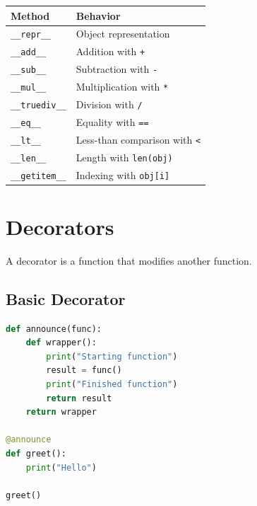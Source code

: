 \documentclass[12pt,oneside]{book}
\numberwithin{equation}{section}
\theoremstyle{definition}
\theoremstyle{plain}
\theoremstyle{remark}
\begin{document}
\begin{center}
\begin{xltabular}{\textwidth}{>{\raggedright\arraybackslash}p{0.25\textwidth}
>{\raggedright\arraybackslash}X}
\toprule
Method & Behavior \\
\midrule
\texttt{\_\_repr\_\_} & Object representation \\

\texttt{\_\_add\_\_} & Addition with \texttt{+} \\

\texttt{\_\_sub\_\_} & Subtraction with \texttt{-} \\

\texttt{\_\_mul\_\_} & Multiplication with \texttt{*} \\

\texttt{\_\_truediv\_\_} & Division with \texttt{/} \\

\texttt{\_\_eq\_\_} & Equality with \texttt{==} \\

\texttt{\_\_lt\_\_} & Less-than comparison with \texttt{<} \\

\texttt{\_\_len\_\_} & Length with \texttt{len(obj)} \\

\texttt{\_\_getitem\_\_} & Indexing with \texttt{obj[i]} \\
\bottomrule
\end{xltabular}
\end{center}

\section{Decorators}

A decorator is a function that modifies another function.

\subsection{Basic Decorator}

\begin{lstlisting}[language=Python]
def announce(func):
    def wrapper():
        print("Starting function")
        result = func()
        print("Finished function")
        return result
    return wrapper

@announce
def greet():
    print("Hello")

greet()
\end{lstlisting}
\end{document}
